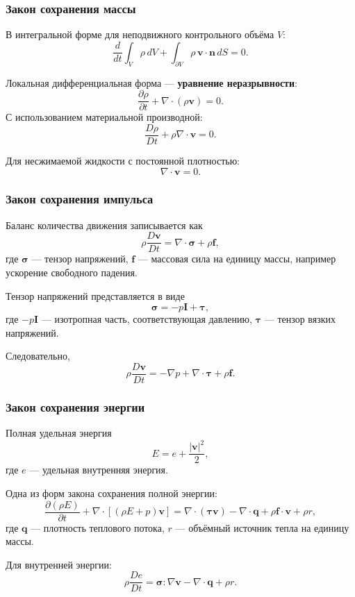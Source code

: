 \subsubsection*{Закон сохранения массы}

В интегральной форме для неподвижного контрольного объёма $V$:
\[
\frac{d}{dt}\int_V \rho\,dV
+
\int_{\partial V}
\rho\,\mathbf{v}\cdot\mathbf{n}\,dS
=
0.
\]

Локальная дифференциальная форма --- \textbf{уравнение неразрывности}:
\[
\frac{\partial \rho}{\partial t}
+
\nabla\cdot(\rho\mathbf{v})
=
0.
\]
С использованием материальной производной:
\[
\frac{D\rho}{Dt}
+
\rho\nabla\cdot\mathbf{v}
=
0.
\]

Для несжимаемой жидкости с постоянной плотностью:
\[
\nabla\cdot\mathbf{v}=0.
\]

\subsubsection*{Закон сохранения импульса}

Баланс количества движения записывается как
\[
\rho\frac{D\mathbf{v}}{Dt}
=
\nabla\cdot\boldsymbol{\sigma}
+
\rho\mathbf{f},
\]
где $\boldsymbol{\sigma}$ --- тензор напряжений,
$\mathbf{f}$ --- массовая сила на единицу массы, например ускорение свободного
падения.

Тензор напряжений представляется в виде
\[
\boldsymbol{\sigma}
=
-p\mathbf{I}
+
\boldsymbol{\tau},
\]
где $-p\mathbf{I}$ --- изотропная часть, соответствующая давлению,
$\boldsymbol{\tau}$ --- тензор вязких напряжений.

Следовательно,
\[
\rho\frac{D\mathbf{v}}{Dt}
=
-\nabla p
+
\nabla\cdot\boldsymbol{\tau}
+
\rho\mathbf{f}.
\]

\subsubsection*{Закон сохранения энергии}

Полная удельная энергия
\[
E=e+\frac{|\mathbf{v}|^2}{2},
\]
где $e$ --- удельная внутренняя энергия.

Одна из форм закона сохранения полной энергии:
\[
\frac{\partial(\rho E)}{\partial t}
+
\nabla\cdot\left[(\rho E+p)\mathbf{v}\right]
=
\nabla\cdot(\boldsymbol{\tau}\mathbf{v})
-
\nabla\cdot\mathbf{q}
+
\rho\mathbf{f}\cdot\mathbf{v}
+
\rho r,
\]
где $\mathbf{q}$ --- плотность теплового потока, $r$ --- объёмный источник тепла на единицу массы.

Для внутренней энергии:
\[
\rho\frac{De}{Dt}
=
\boldsymbol{\sigma}:\nabla\mathbf{v}
-
\nabla\cdot\mathbf{q}
+
\rho r.
\]

